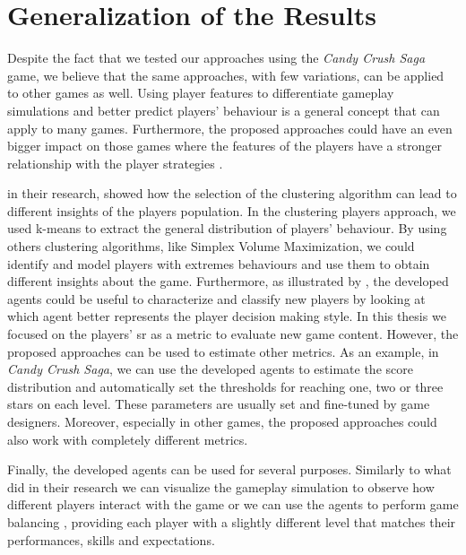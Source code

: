 \section{Generalization of the Results}
Despite the fact that we tested our approaches using the \textit{Candy Crush Saga} game, we believe that the same approaches, with few variations, can be applied to other games as well. Using player features to differentiate gameplay simulations and better predict players' behaviour is a general concept that can apply to many games. Furthermore, the proposed approaches could have an even bigger impact on those games where the features of the players have a stronger relationship with the player strategies \cite{holmgard_evolving_2014}. 

\textcite{drachen_guns_2012} in their research, showed how the selection of the clustering algorithm can lead to different insights of the players population. In the clustering players approach, we used k-means to extract the general distribution of players' behaviour. By using others clustering algorithms, like Simplex Volume Maximization, we could identify and model players with extremes behaviours and use them to obtain different insights about the game. Furthermore, as illustrated by \textcite{holmgard_evolving_2016}, the developed agents could be useful to characterize and classify new players by looking at which agent better represents the player decision making style.
In this thesis we focused on the players' \acs{sr} as a metric to evaluate new game content. However, the proposed approaches can be used to estimate other metrics. As an example, in \textit{Candy Crush Saga}, we can use the developed agents to estimate the score distribution and automatically set the thresholds for reaching one, two or three stars on each level. These parameters are usually set and fine-tuned by game designers.
Moreover, especially in other games, the proposed approaches could also work with completely different metrics.

Finally, the developed agents can be used for several purposes. Similarly to what \textcite{holmgard_evolving_2014} did in their research we can visualize the gameplay simulation to observe how different players interact with the game or we can use the agents to perform game balancing \cite{hunicke_case_2005}, providing each player with a slightly different level that matches their performances, skills and expectations.

